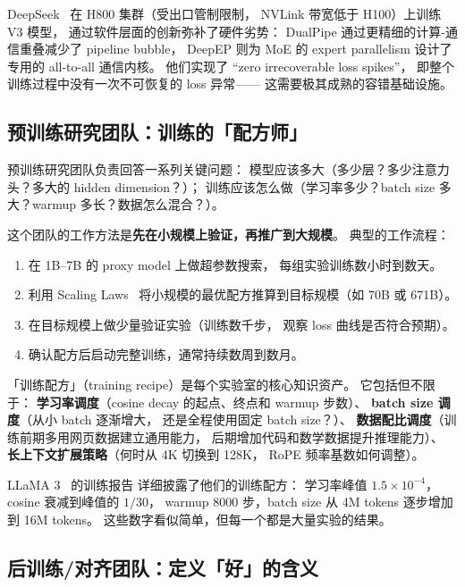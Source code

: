 \begin{corebox}
DeepSeek~\cite{deepseekv3} 在 H800 集群（受出口管制限制，
NVLink 带宽低于 H100）上训练 V3 模型，
通过软件层面的创新弥补了硬件劣势：
DualPipe 通过更精细的计算-通信重叠减少了 pipeline bubble，
DeepEP 则为 MoE 的 expert parallelism
设计了专用的 all-to-all 通信内核。
他们实现了 “zero irrecoverable loss spikes”，
即整个训练过程中没有一次不可恢复的 loss 异常——
这需要极其成熟的容错基础设施。
\end{corebox}

\subsection{预训练研究团队：训练的「配方师」}

预训练研究团队负责回答一系列关键问题：
模型应该多大（多少层？多少注意力头？多大的 hidden dimension？）；
训练应该怎么做（学习率多少？batch size 多大？warmup 多长？数据怎么混合？）。

这个团队的工作方法是\textbf{先在小规模上验证，再推广到大规模}。
典型的工作流程：

\begin{enumerate}[noitemsep]
  \item 在 1B--7B 的 proxy model 上做超参数搜索，
        每组实验训练数小时到数天。
  \item 利用 Scaling Laws~\cite{kaplan2020scaling,hoffmann2022chinchilla}
        将小规模的最优配方推算到目标规模（如 70B 或 671B）。
  \item 在目标规模上做少量验证实验（训练数千步，
        观察 loss 曲线是否符合预期）。
  \item 确认配方后启动完整训练，通常持续数周到数月。
\end{enumerate}

「训练配方」（training recipe）是每个实验室的核心知识资产。
它包括但不限于：
\textbf{学习率调度}（cosine decay 的起点、终点和 warmup 步数）、
\textbf{batch size 调度}（从小 batch 逐渐增大，
还是全程使用固定 batch size？）、
\textbf{数据配比调度}（训练前期多用网页数据建立通用能力，
后期增加代码和数学数据提升推理能力）、
\textbf{长上下文扩展策略}（何时从 4K 切换到 128K，
RoPE 频率基数如何调整）。

LLaMA 3~\cite{dubey2024llama3} 的训练报告
详细披露了他们的训练配方：
学习率峰值 $1.5 \times 10^{-4}$，
cosine 衰减到峰值的 $1/30$，
warmup 8000 步，batch size 从 4M tokens 逐步增加到 16M tokens。
这些数字看似简单，但每一个都是大量实验的结果。

\subsection{后训练/对齐团队：定义「好」的含义}

